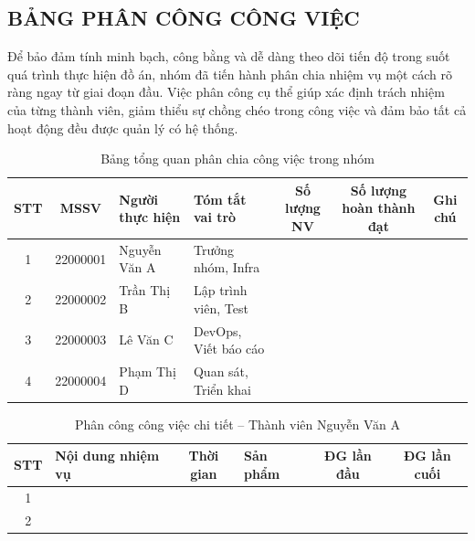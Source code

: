 \clearpage
\pagestyle{appendixlandscape}
\markboth{}{}


\begin{landscape}
\chapter{BẢNG PHÂN CÔNG CÔNG VIỆC}

Để bảo đảm tính minh bạch, công bằng và dễ dàng theo dõi tiến độ trong suốt quá trình thực hiện đồ án,
nhóm đã tiến hành phân chia nhiệm vụ một cách rõ ràng ngay từ giai đoạn đầu. Việc phân công cụ thể
giúp xác định trách nhiệm của từng thành viên, giảm thiểu sự chồng chéo trong công việc và đảm bảo
tất cả hoạt động đều được quản lý có hệ thống.

\begin{table}[htbp]
    \caption{Bảng tổng quan phân chia công việc trong nhóm}
    \centering
    \begin{tabularx}{\linewidth}{@{} c c X X c c c @{}}
    \toprule
    \textbf{STT} & \textbf{MSSV} & \textbf{Người thực hiện} & \textbf{Tóm tắt vai trò} &
    \textbf{Số lượng NV} & \textbf{Số lượng hoàn thành đạt} & \textbf{Ghi chú} \\
    \midrule
    1 & 22000001 & Nguyễn Văn A & Trưởng nhóm, Infra & & & \\[4pt]
    2 & 22000002 & Trần Thị B & Lập trình viên, Test & & & \\[4pt]
    3 & 22000003 & Lê Văn C & DevOps, Viết báo cáo & & & \\[4pt]
    4 & 22000004 & Phạm Thị D & Quan sát, Triển khai & & & \\
    \bottomrule
    \end{tabularx}
\end{table}
\end{landscape}

\begin{landscape}
\begin{table}[htbp]
    \caption{Phân công công việc chi tiết -- Thành viên Nguyễn Văn A}
    \centering
    \begin{tabularx}{\linewidth}{@{} c X c X c c @{}}
    \toprule
    \textbf{STT} & \textbf{Nội dung nhiệm vụ} & \textbf{Thời gian} & \textbf{Sản phẩm} &
    \textbf{ĐG lần đầu} & \textbf{ĐG lần cuối} \\
    \midrule
    1 & & & & & \\[4pt]
    2 & & & & & \\
    \bottomrule
    \end{tabularx}
\end{table}
\end{landscape}

